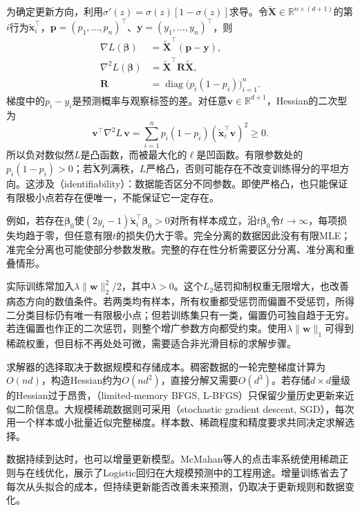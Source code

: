 为确定更新方向，利用$\sigma'(z)=\sigma(z)[1-\sigma(z)]$求导。令$\tilde{\bm{X}}\in\mathbb{R}^{n\times(d+1)}$的第$i$行为$\tilde{\bm{x}}_i^{\top}$，$\bm{p}=(p_1,\ldots,p_n)^{\top}$、$\bm{y}=(y_1,\ldots,y_n)^{\top}$，则
\begin{equation}
  \label{eq:classification-logistic-derivatives}
  \begin{aligned}
    \nabla L(\bm{\beta})
      &=\tilde{\bm{X}}^{\top}(\bm{p}-\bm{y}),\\
    \nabla^2 L(\bm{\beta})
      &=\tilde{\bm{X}}^{\top}\bm{R}\tilde{\bm{X}},\\
    \bm{R}
      &=\operatorname{diag}\bigl(p_i(1-p_i)\bigr)_{i=1}^{n}.
  \end{aligned}
\end{equation}
梯度中的$p_i-y_i$是预测概率与观察标签的差。对任意$\bm{v}\in\mathbb{R}^{d+1}$，Hessian的二次型为
\[
  \bm{v}^{\top}\nabla^2L\,\bm{v}
  =\sum_{i=1}^{n}p_i(1-p_i)
    (\tilde{\bm{x}}_i^{\top}\bm{v})^2\geq0.
\]
所以负对数似然$L$是凸函数，而被最大化的$\ell$是凹函数。有限参数处的$p_i(1-p_i)>0$；若$\tilde{\bm{X}}$列满秩，$L$严格凸，否则可能存在不改变训练得分的平坦方向。这涉及（identifiability）：数据能否区分不同参数。即使严格凸，也只能保证有限极小点若存在便唯一，不能保证它一定存在。

例如，若存在$\bm{\beta}_0$使$(2y_i-1)\tilde{\bm{x}}_i^{\top}\bm{\beta}_0>0$对所有样本成立，沿$t\bm{\beta}_0$令$t\to\infty$，每项损失均趋于零，但任意有限$t$的损失仍大于零。完全分离的数据因此没有有限MLE；准完全分离也可能使部分参数发散。完整的存在性分析需要区分分离、准分离和重叠情形。

实际训练常加入$\lambda\lVert\bm{w}\rVert_2^2/2$，其中$\lambda>0$。这个$L_2$惩罚抑制权重无限增大，也改善病态方向的数值条件。若两类均有样本，所有权重都受惩罚而偏置不受惩罚，所得二分类目标仍有唯一有限极小点；但若训练集只有一类，偏置仍可独自趋于无穷。若连偏置也作正的二次惩罚，则整个增广参数方向都受约束。使用$\lambda\lVert\bm{w}\rVert_1$可得到稀疏权重，但目标不再处处可微，需要适合非光滑目标的求解步骤。

求解器的选择取决于数据规模和存储成本。稠密数据的一轮完整梯度计算为$O(nd)$，构造Hessian约为$O(nd^2)$，直接分解又需要$O(d^3)$。若存储$d\times d$量级的Hessian过于昂贵，（limited-memory BFGS, L-BFGS）只保留少量历史更新来近似二阶信息。大规模稀疏数据则可采用（stochastic gradient descent, SGD），每次用一个样本或小批量近似完整梯度。样本数、稀疏程度和精度要求共同决定求解选择。

数据持续到达时，也可以增量更新模型。McMahan等人的点击率系统使用稀疏正则与在线优化，展示了Logistic回归在大规模预测中的工程用途。增量训练省去了每次从头拟合的成本，但持续更新能否改善未来预测，仍取决于更新规则和数据变化。

